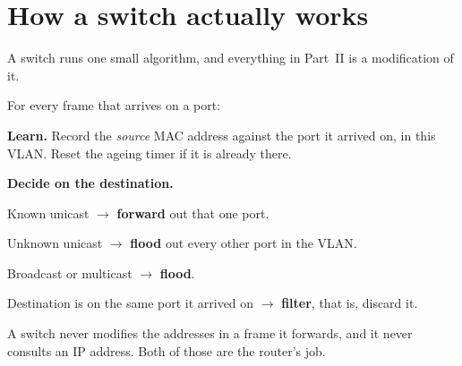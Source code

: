 \section{How a switch actually works}

A switch runs one small algorithm, and everything in Part~II is a modification
of it.

\begin{conceptbox}
For every frame that arrives on a port:
\begin{tightnum}
  \item \textbf{Learn.} Record the \emph{source} MAC address against the port it
        arrived on, in this VLAN. Reset the ageing timer if it is already there.
  \item \textbf{Decide on the destination.}
        \begin{tight}
          \item Known unicast $\rightarrow$ \textbf{forward} out that one port.
          \item Unknown unicast $\rightarrow$ \textbf{flood} out every other port
                in the VLAN.
          \item Broadcast or multicast $\rightarrow$ \textbf{flood}.
          \item Destination is on the same port it arrived on $\rightarrow$
                \textbf{filter}, that is, discard it.
        \end{tight}
\end{tightnum}
A switch never modifies the addresses in a frame it forwards, and it never
consults an IP address. Both of those are the router's job.
\end{conceptbox}

